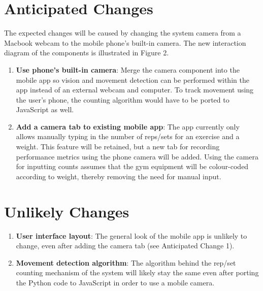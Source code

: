 \documentclass{article}
\begin{document}
\section{Anticipated Changes}
The expected changes will be caused by changing the system camera from a Macbook webcam to the mobile phone's built-in camera. The new interaction diagram of the components is illustrated in Figure 2.
\begin{enumerate}
    \item \textbf{Use phone's built-in camera}: Merge the camera component into the mobile app so vision and movement detection can be performed within the app instead of an external webcam and computer. To track movement using the user's phone, the counting algorithm would have to be ported to JavaScript as well.
    \item \textbf{Add a camera tab to existing mobile app}: The app currently only allows manually typing in the number of reps/sets for an exercise and a weight. This feature will be retained, but a new tab for recording performance metrics using the phone camera will be added. Using the camera for inputting counts assumes that the gym equipment will be colour-coded according to weight, thereby removing the need for manual input.
\end{enumerate}


\begingroup
\begin{center}
\begin{figure}[h]
\end{figure}
\end{center}
\endgroup

\section{Unlikely Changes}
\begin{enumerate}
    \item \textbf{User interface layout}: The general look of the mobile app is unlikely to change, even after adding the camera tab (see Anticipated Change 1).
    \item \textbf{Movement detection algorithm}: The algorithm behind the rep/set counting mechanism of the system will likely stay the same even after porting the Python code to JavaScript in order to use a mobile camera.
\end{enumerate}
\end{document}
